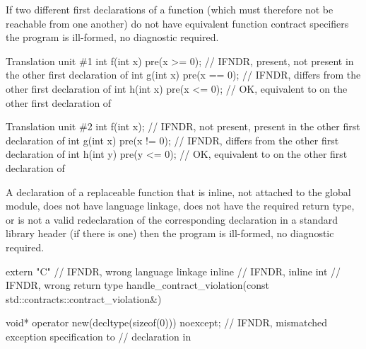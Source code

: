 
\pnum
If two different first declarations of a function
(which must therefore not be reachable from one another)
do not have equivalent function contract specifiers
the program is ill-formed, no diagnostic required.

\pnum
\begin{example}
\begin{codeblocktu}{Translation unit \#1}
int f(int x) pre(x >= 0);       // IFNDR,  present, not present in the other first declaration of 
int g(int x) pre(x == 0);       // IFNDR,  differs from the other first declaration of 
int h(int x) pre(x <= 0);       // OK,  equivalent to  on the other first declaration of 
\end{codeblocktu}
\begin{codeblocktu}{Translation unit \#2}
int f(int x);                   // IFNDR,  not present, present in the other first declaration of 
int g(int x) pre(x != 0);       // IFNDR,  differs from the other first declaration of 
int h(int y) pre(y <= 0);       // OK,  equivalent to  on the other first declaration of 
\end{codeblocktu}
\end{example}


\pnum
A declaration of a replaceable function
that is inline,
not attached to the global module,
does not have \Cpp{} language linkage,
does not have the required return type,
or is not a valid redeclaration of the
corresponding declaration in a standard library header (if there is one)
then the program is ill-formed, no diagnostic required.

\pnum
\begin{example}
\begin{codeblock}
extern "C"  // IFNDR, wrong language linkage
inline      // IFNDR, inline
int         // IFNDR, wrong return type
handle_contract_violation(const std::contracts::contract_violation&) {}

void* operator new(decltype(sizeof(0))) noexcept;   // IFNDR, mismatched exception specification to
                                                    // declaration in 
\end{codeblock}
\end{example}

